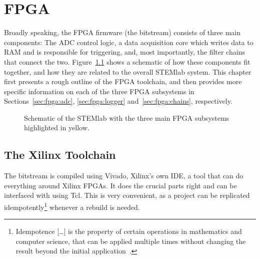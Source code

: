 %
%
\chapter{FPGA} %
\label{ch:fpga}
%
%
Broadly speaking,  the FPGA  firmware (the bitstream)  consists of  three main
components:  The ADC control logic, a  data acquisition core which writes data
to  RAM  and  is  responsible  for  triggering,  and,  most  importantly,  the
filter chains  that connect the two.   Figure~\ref{fig:fpga:structure} shows a
schematic of  how these components fit  together, and how they  are related to
the overall STEMlab system. This chapter first presents a rough outline of the
FPGA toolchain,  and then provides  more specific  information on each  of the
three  FPGA subsystems  in Sections~\ref{sec:fpga:adc},  \ref{sec:fpga:logger}
and~\ref{sec:fpga:chains}, respectively.

\begin{figure}
    \centering
    
    \caption[System Schematic]{%
        Schematic  of  the  STEMlab  with   the  three  main  FPGA  subsystems
        highlighted in yellow.%
    }
    \label{fig:fpga:structure}
\end{figure}
%
%
\section{The Xilinx Toolchain} %
\label{sec:fpga:toolchain}

The bitstream is compiled  using Vivado, Xilinx's own IDE, a  tool that can do
everything around  Xilinx FPGAs. It does  the crucial  parts right and  can be
interfaced  with using  Tcl. This  is very  convenient, as  a  project can  be
replicated idempotently\footnote{%
    Idempotence [\ldots] is the property  of certain operations in mathematics
    and computer science, that can  be applied multiple times without changing
    the result beyond the initial application~\cite{wiki:idempotence}.%
}%
whenever a rebuild is needed.

